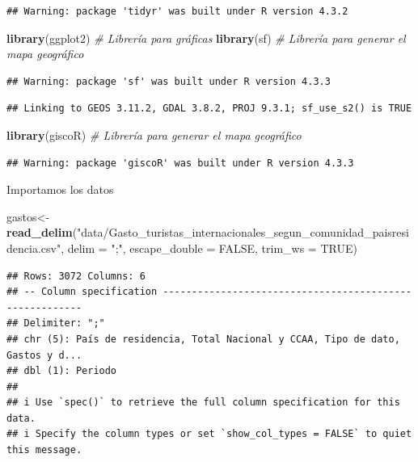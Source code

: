 \documentclass[data,article,submit,moreauthors,pdftex]{Definitions/mdpi}
\newenvironment{Shaded}{\begin{snugshade}}{\end{snugshade}}
\newcommand{\AttributeTok}[1]{\textcolor[rgb]{0.13,0.29,0.53}{#1}}
\newcommand{\CommentTok}[1]{\textcolor[rgb]{0.56,0.35,0.01}{\textit{#1}}}
\newcommand{\ConstantTok}[1]{\textcolor[rgb]{0.56,0.35,0.01}{#1}}
\newcommand{\FunctionTok}[1]{\textcolor[rgb]{0.13,0.29,0.53}{\textbf{#1}}}
\newcommand{\NormalTok}[1]{#1}
\newcommand{\OtherTok}[1]{\textcolor[rgb]{0.56,0.35,0.01}{#1}}
\newcommand{\StringTok}[1]{\textcolor[rgb]{0.31,0.60,0.02}{#1}}
\begin{document}
\begin{verbatim}
## Warning: package 'tidyr' was built under R version 4.3.2
\end{verbatim}

\begin{Shaded}
\begin{Highlighting}[]
\FunctionTok{library}\NormalTok{(ggplot2) }\CommentTok{\# Librería para gráficas}
\FunctionTok{library}\NormalTok{(sf) }\CommentTok{\# Librería para generar el mapa geográfico}
\end{Highlighting}
\end{Shaded}

\begin{verbatim}
## Warning: package 'sf' was built under R version 4.3.3
\end{verbatim}

\begin{verbatim}
## Linking to GEOS 3.11.2, GDAL 3.8.2, PROJ 9.3.1; sf_use_s2() is TRUE
\end{verbatim}

\begin{Shaded}
\begin{Highlighting}[]
\FunctionTok{library}\NormalTok{(giscoR) }\CommentTok{\# Librería para generar el mapa geográfico}
\end{Highlighting}
\end{Shaded}

\begin{verbatim}
## Warning: package 'giscoR' was built under R version 4.3.3
\end{verbatim}

Importamos los datos

\begin{Shaded}
\begin{Highlighting}[]
\NormalTok{gastos}\OtherTok{\textless{}{-}} \FunctionTok{read\_delim}\NormalTok{(}\StringTok{"data/Gasto\_turistas\_internacionales\_segun\_comunidad\_paisresidencia.csv"}\NormalTok{,  }\AttributeTok{delim =} \StringTok{";"}\NormalTok{, }\AttributeTok{escape\_double =} \ConstantTok{FALSE}\NormalTok{, }\AttributeTok{trim\_ws =} \ConstantTok{TRUE}\NormalTok{)}
\end{Highlighting}
\end{Shaded}

\begin{verbatim}
## Rows: 3072 Columns: 6
## -- Column specification --------------------------------------------------------
## Delimiter: ";"
## chr (5): País de residencia, Total Nacional y CCAA, Tipo de dato, Gastos y d...
## dbl (1): Periodo
## 
## i Use `spec()` to retrieve the full column specification for this data.
## i Specify the column types or set `show_col_types = FALSE` to quiet this message.
\end{verbatim}
\end{document}
